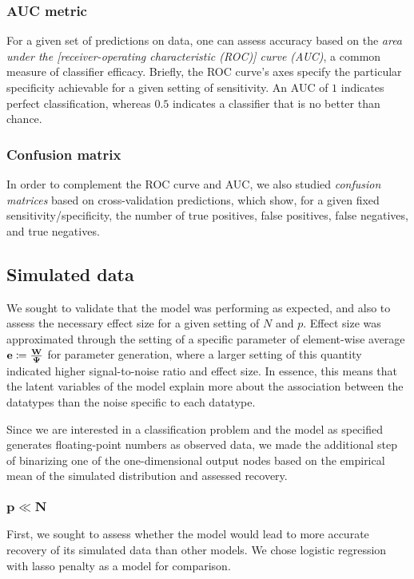 \subsubsection{AUC metric}
For a given set of predictions on data, one can assess accuracy based on the \textit{area under the [receiver-operating characteristic (ROC)] curve (AUC)}, a common measure of classifier efficacy\cite{friedman_elements_2001}. Briefly, the ROC curve's axes specify the particular specificity achievable for a given setting of sensitivity. An AUC of $1$ indicates perfect classification, whereas $0.5$ indicates a classifier that is no better than chance.

\subsubsection{Confusion matrix}
In order to complement the ROC curve and AUC, we also studied \textit{confusion matrices} based on cross-validation predictions, which show, for a given fixed sensitivity/specificity, the number of true positives, false positives, false negatives, and true negatives.

\subsection{Simulated data} 

We sought to validate that the model was performing as expected, and also to assess the necessary effect size for a given setting of $N$ and $p$. Effect size was approximated through the setting of a specific parameter of element-wise average $\mathbf{e} \coloneqq \frac{\bold{W}}{\bold{\Psi}}$ for parameter generation, where a larger setting of this quantity indicated higher signal-to-noise ratio and effect size. In essence, this means that the latent variables of the model explain more about the association between the datatypes than the noise specific to each datatype.

Since we are interested in a classification problem and the model as specified generates floating-point numbers as observed data, we made the additional step of binarizing one of the one-dimensional output nodes based on the empirical mean of the simulated distribution and assessed recovery.


\subsubsection{$\mathbf{p \ll N}$}

First, we sought to assess whether the model would lead to more accurate recovery of its simulated data than other models. We chose logistic regression with lasso penalty as a model for comparison.

